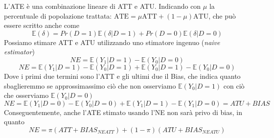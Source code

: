 L'ATE è una combinazione lineare di ATT e ATU. Indicando con $\mu$ la percentuale di popolazione
trattata: $\mathrm{ATE} = \mu \mathrm{ATT} + (1 - \mu) \mathrm{ATU}$, che può essere scritto
anche come \begin{equation}
   \mathbb E(\delta) = Pr(D=1)\mathbb E (\delta|D=1) +Pr(D=0)\mathbb E(\delta | D=0)
\end{equation}
Possiamo stimare ATT e ATU utilizzando uno stimatore ingenuo (\textit{naive estimator})
\begin{equation}
   NE = \mathbb E (Y_1|D=1) - \mathbb E(Y_0|D=0)
\end{equation}
\begin{equation}
   NE = \mathbb E (Y_1|D=1) - \mathbb E(Y_0|D=1) + \mathbb E(Y_0|D=1) - \mathbb E (Y_0|D=0)
\end{equation}
Dove i primi due termini sono l'ATT e gli ultimi due il Bias, che indica quanto sbaglieremmo
se approssimassimo ciò che non osserviamo $\mathbb E (Y_0|D=1)$ con ciò che osserviamo 
$\mathbb E (Y_0|D=0)$
\begin{equation}
   NE = \mathbb E (Y_1|D=0) - \mathbb E(Y_0|D=0) + \mathbb E(Y_1|D=1) - \mathbb E (Y_1|D=0) = ATU + BIAS
\end{equation}
Conseguentemente, anche l'ATE stimato usando l'NE non sarà privo di bias, in quanto 
\begin{equation}
    NE = \pi(ATT + BIAS_{NEATT}) + (1-\pi)(ATU + BIAS_{NEATU})
\end{equation}
